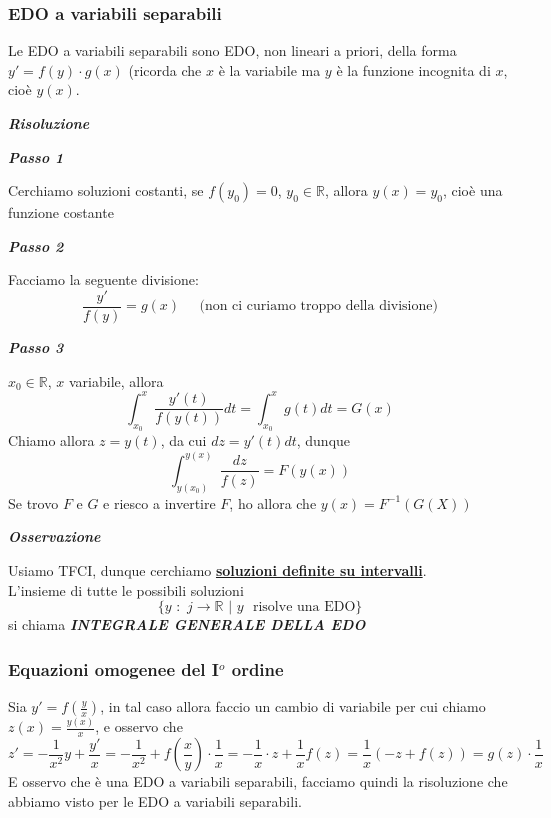 \documentclass{article}
\theoremstyle{definition}
\newcommand{\R}{\mathbb{R}}
\begin{document}
\subsubsection{EDO a variabili separabili}
Le EDO a variabili separabili sono EDO, non lineari a priori, della forma $y'=f(y) \cdot g(x)$ (ricorda che $x$ è la variabile ma $y$ è la funzione incognita di $x$, cioè $y(x)$.
\\
\begin{center}
    \textbf{\textit{Risoluzione}}
\end{center}
\begin{center}
    \textbf{\textit{Passo 1}}
\end{center}
Cerchiamo soluzioni costanti, se $f(y_0)=0$, $y_0 \in \R$, allora $y(x)=y_0$, cioè una funzione costante
\begin{center}
    \textbf{\textit{Passo 2}}
\end{center}
Facciamo la seguente divisione:
\begin{equation}
    \frac{y'}{f(y)}=g(x) \,\,\,\,\,\,\,\ \mbox{(non ci curiamo troppo della divisione)}
\end{equation}
\begin{center}
    \textbf{\textit{Passo 3}}
\end{center}
$x_0 \in \R$, $x$ variabile, allora
\begin{equation}
    \int_{x_0}^x \frac{y'(t)}{f(y(t))} dt=\int_{x_0}^x g(t)dt=G(x)
\end{equation}
Chiamo allora $z=y(t)$, da cui $dz=y'(t)dt$, dunque
\begin{equation}
    \int_{y(x_0)}^{y(x)}\frac{dz}{f(z)}=F(y(x))
\end{equation}
Se trovo $F$ e $G$ e riesco a invertire $F$, ho allora che $y(x)=F^{-1}(G(X))$
\begin{center}
    \textbf{\textit{Osservazione}}
\end{center}
Usiamo TFCI, dunque cerchiamo \underline{\textbf{soluzioni definite su intervalli}}.
\\
L'insieme di tutte le possibili soluzioni
\begin{equation}
    \{y \,\, : \,\, j \to \R \,\, | \,\, y \,\,\,\, \mbox{risolve una EDO}\}
\end{equation}
si chiama  \textbf{\textit{INTEGRALE GENERALE DELLA EDO}}

\subsubsection{Equazioni omogenee del I$^o$ ordine}
Sia $y'=f(\frac{y}{x})$, in tal caso allora faccio un cambio di variabile per cui chiamo $z(x)=\frac{y(x)}{x}$, e osservo che
\begin{equation}
    z'=-\frac{1}{x^2}y+\frac{y'}{x}=-\frac{1}{x^2}+f(\frac{x}{y}) \cdot \frac{1}{x}=-\frac{1}{x} \cdot z + \frac{1}{x} f(z) = \frac{1}{x} (-z+f(z))=g(z) \cdot \frac{1}{x}
\end{equation}
E osservo che è una EDO a variabili separabili, facciamo quindi la risoluzione che abbiamo visto per le EDO a variabili separabili.
\end{document}
